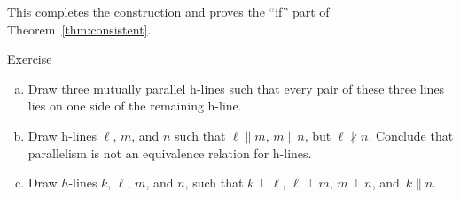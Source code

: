 This completes the construction and proves the ``if'' part
of Theorem~\ref{thm:consistent}.

\begin{thm}{Exercise}\label{ex:3-h-lines}
\begin{enumerate}[(a)]

\item Draw three mutually parallel h-lines
such that every pair of these three lines lies on one side of the remaining h-line.

\item Draw h-lines $\ell$, $m$, and $n$ such that $\ell\parallel m$, $m\parallel n$, but $\ell\nparallel n$.
Conclude that parallelism is not an equivalence relation for h-lines.

\item Draw $h$-lines $k$, $\ell$, $m$, and $n$, such that $k\perp \ell$, $\ell\perp m$, $m\perp n$, and~$k\parallel n$.
\end{enumerate}
\end{thm}
 

